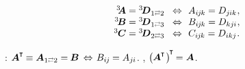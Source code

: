 \nopagebreak\vspace{-0.2em}\begin{equation}\label{tensoraction:transposing}
\begin{array}{rcl}
{^3\hspace{-0.3em}\bm{A}} = {^3\hspace{-0.16em}\bm{D}}_{1 \scalebox{0.6}[0.8]{$\rightleftarrows$} 2}
& \!\Leftrightarrow\!\! &
A_{i\hspace{-0.1ex}j\hspace{-0.1ex}k} = D_{j\hspace{-0.06ex}ik}
\hspace{.1ex} ,
\\
{^3\hspace{-0.15em}\bm{B}} = {^3\hspace{-0.16em}\bm{D}}_{1 \scalebox{0.6}[0.8]{$\rightleftarrows$} 3}
& \!\Leftrightarrow\!\! &
B_{i\hspace{-0.1ex}j\hspace{-0.1ex}k} = D_{kj\hspace{-0.06ex}i}
\hspace{.1ex} ,
\\
{^3\hspace{-0.05em}\bm{C}} = {^3\hspace{-0.16em}\bm{D}}_{2 \scalebox{0.6}[0.8]{$\rightleftarrows$} 3}
& \!\Leftrightarrow\!\! &
C_{i\hspace{-0.1ex}j\hspace{-0.1ex}k} = D_{ikj}
\hspace{.1ex} .
\end{array}
\end{equation}

\en{,}
:
${\bm{A}^{\hspace{-0.05em}\T} \hspace{-0.15ex} \equiv \bm{A}_{1 \scalebox{0.6}[0.8]{$\rightleftarrows$} 2} = \hspace{-0.1ex} \bm{B}
\hspace{.4ex}\Leftrightarrow\hspace{.25ex}
B_{i\hspace{-0.1ex}j} \hspace{-0.1ex} = A_{j\hspace{-0.06ex}i}}$.
,
${\bigl( \hspace{-0.1ex} \bm{A}^{\hspace{-0.05em}\T} \hspace{.15ex} \bigr)^{\hspace{-0.25ex}\T} \hspace{-0.2ex} = \bm{A}}$.

